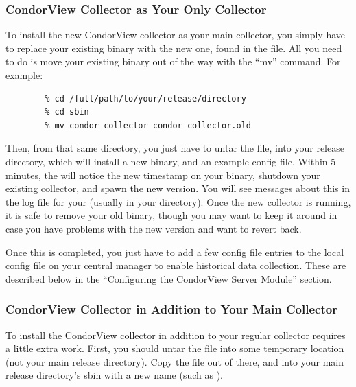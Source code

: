 \subsubsection{\label{sec:CondorView-Server-Only}
CondorView Collector as Your Only Collector} 

To install the new CondorView collector as your main collector, you
simply have to replace your existing binary with the new one, found in
the  file.
All you need to do is move your existing 
binary out of the way with the ``mv'' command.
For example:
\begin{verbatim}
        % cd /full/path/to/your/release/directory
        % cd sbin
        % mv condor_collector condor_collector.old
\end{verbatim}
Then, from that same directory, you just have to untar the
 file, into your release directory, which will
install a new  binary, and an example config
file.
Within 5 minutes, the  will notice the new timestamp on
your  binary, shutdown your existing
collector, and spawn the new version.
You will see messages about this in the log file for your
 (usually  in your 
directory).
Once the new collector is running, it is safe to remove your old
binary, though you may want to keep it around in case you have
problems with the new version and want to revert back.

Once this is completed, you just have to add a few config file entries
to the local config file on your central manager to enable historical
data collection.
These are described below in the ``Configuring the CondorView Server 
Module'' section.

\subsubsection{\label{sec:CondorView-Server-Both}
CondorView Collector in Addition to Your Main Collector} 

To install the CondorView collector in addition to your regular
collector requires a little extra work.
First, you should untar the  file into some
temporary location (not your main release directory).
Copy the  file out of there, and into
your main release directory's sbin with a new name (such as
).

